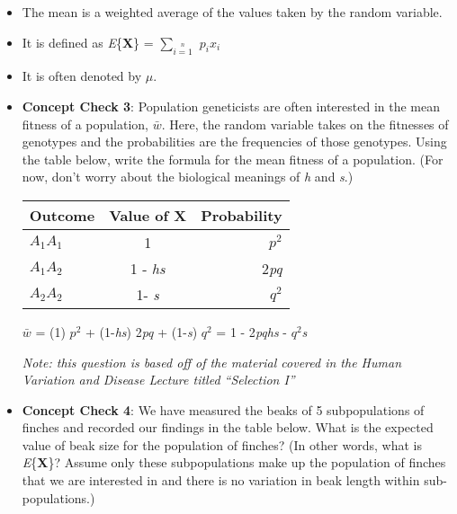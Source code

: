 \documentclass[12pt]{report}
\begin{document}
\begin{itemize}

\item The mean is a weighted average of the values taken by the random variable.

\item It is defined as \textit{E}\{\textbf{X}\} =  $\sum\limits_{i = 1}\limits^{n}$ \textit{$p_{i}$}\textit{$x_{i}$} 

\item It is often denoted by $\mu$.

\item \textbf{Concept Check 3}: Population geneticists are often interested in the mean fitness of a population, $\bar{w}$. Here, the random variable takes on the fitnesses of genotypes and the probabilities are the frequencies of those genotypes. Using the table below, write the formula for the mean fitness of a population. (For now, don't worry about the biological meanings of \textit{h} and \textit{s}.) 

\bigskip
\begin{tabular}{| l | c | r |}
	\hline
 Outcome & Value of \textbf{X} & Probability \\ \hline
  \textit{$A_{1}$$A_{1}$} & 1 & \textit{$p^{2}$} \\
  \textit{$A_{1}$$A_{2}$} & 1 - \textit{hs} & 2\textit{pq} \\
  \textit{$A_{2}$$A_{2}$} & 1- \textit{s} & \textit{$q^{2}$} \\ \hline
\end{tabular}

\bigskip

\color{red} $\bar{w}$ = (1) \textit{$p^{2}$} + (1-\textit{hs}) 2\textit{pq} + (1-\textit{s}) \textit{$q^{2}$} = 1 - 2\textit{pqhs} - \textit{$q^{2}$}\textit{s}

\bigskip
\color{black}

\textit{Note: this question is based off of the material covered in the Human Variation and Disease Lecture titled ``Selection I''}

\item \textbf{Concept Check 4}: We have measured the beaks of 5 subpopulations of finches and recorded our findings in the table below. What is the expected value of beak size for the population of finches? (In other words, what is \textit{E}\{\textbf{X}\}? Assume only these subpopulations make up the population of finches that we are interested in and there is no variation in beak length within sub-populations.) 


\end{itemize}
\end{document}
